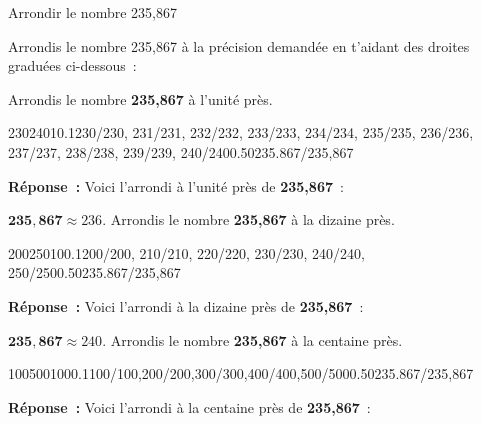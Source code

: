 \documentclass[a4paper,11pt]{report}
\begin{document}
\begin{resolu}{Arrondir le nombre 235,867}{Arrondis le nombre 235,867 à la précision demandée en t'aidant des droites graduées ci-dessous~:
\begin{tasks}
\task Arrondis le nombre {\bf 235,867} à l'unité près.
\begin{center}
\begin{numberlined}{230}{240}{1}{0.1}{230/230, 231/231, 232/232, 233/233, 234/234, 235/235, 236/236, 237/237, 238/238, 239/239, 240/240}{0.5}{0}{235.867/{235,867}}\end{numberlined}
\end{center}
{\bf Réponse~:} Voici l'arrondi à l'unité près de {\bf 235,867}~: 

$\bm{235,867 } \approx 236.$
\task Arrondis le nombre {\bf 235,867} à la dizaine près.
\begin{center}
\begin{numberlined}{200}{250}{10}{0.1}{200/200, 210/210, 220/220, 230/230, 240/240, 250/250}{0.5}{0}{235.867/{235,867}}\end{numberlined}
\end{center}
{\bf Réponse~:} Voici l'arrondi à la dizaine près de {\bf 235,867}~: 

$\bm{235,867 } \approx 240.$
\task Arrondis le nombre {\bf 235,867} à la centaine près.
\begin{center}
\begin{numberlined}{100}{500}{100}{0.1}{100/100,200/200,300/300,400/400,500/500}{0.5}{0}{235.867/{235,867}}\end{numberlined}
\end{center}
{\bf Réponse~:} Voici l'arrondi à la centaine près de {\bf 235,867}~: 


\end{tasks}}
\end{resolu}
\end{document}
